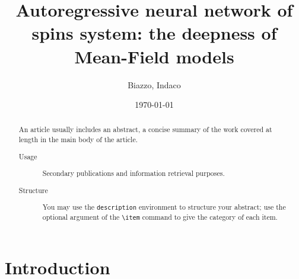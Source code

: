 \documentclass[aps,physrev,10pt,floatfix,longbibliography,nofootinbib,reprint]{revtex4-2}
\begin{document}
\title{Autoregressive neural network of spins system: the deepness of Mean-Field models}
\author{Biazzo, Indaco}

\date{\today}

\begin{abstract}
    An article usually includes an abstract, a concise summary of the work
    covered at length in the main body of the article. 
    \begin{description}
    \item[Usage]
    Secondary publications and information retrieval purposes.
    \item[Structure]
    You may use the \texttt{description} environment to structure your abstract;
    use the optional argument of the \verb+\item+ command to give the category of each item. 
    \end{description}
    \end{abstract}
    
    
\maketitle

\tableofcontents

\section{Introduction}
\end{document}
